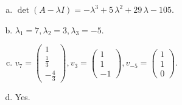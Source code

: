 \begin{questions}
\begin{solution}
\begin{enumerate}[(a)]
\item $\det(A-\lambda I)=-{\lambda}^{3} + 5 \, {\lambda}^{2} + 29 \, {\lambda} - 105$.
\item ${\lambda}_1=7, {\lambda}_2=3, {\lambda}_3=-5$.
\item $v_{7}=\left(\begin{array}{r}
1 \\
\frac{1}{3} \\
-\frac{4}{3}
\end{array}\right), v_{3}=\left(\begin{array}{r}
1 \\
1 \\
-1
\end{array}\right), v_{-5}=\left(\begin{array}{r}
1 \\
1 \\
0
\end{array}\right)$.
\item Yes.
\end{enumerate}
\end{solution}

\end{questions}

\newpage


\begin{center}
\end{center}


